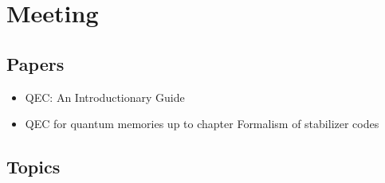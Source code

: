 \section{Meeting}

\subsection{Papers}
\begin{itemize}
    \item QEC: An Introductionary Guide
    \item QEC for quantum memories
    \subitem up to chapter Formalism of stabilizer codes
\end{itemize}


\subsection{Topics}
